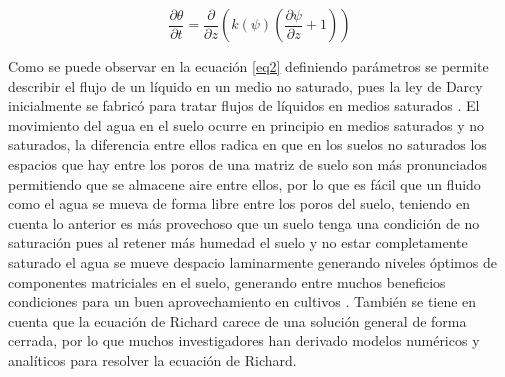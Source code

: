 \begin{equation}
	\frac{\partial\theta}{\partial t}=\frac{\partial}{\partial z}(k(\psi)(\frac{\partial\psi}{\partial z}+1))
	\label{eq2}
\end{equation}

Como se puede observar en la ecuación \eqref{eq2} definiendo parámetros se permite describir el flujo de un líquido en un medio no saturado, pues la ley de Darcy inicialmente se fabricó para tratar flujos de líquidos en medios  saturados \parencite{mawloodcomparison}. El movimiento del agua en el suelo ocurre en principio en medios saturados y no saturados, la diferencia entre ellos radica en que en los suelos no saturados los espacios que hay entre los poros de una matriz de suelo son más pronunciados permitiendo que se almacene aire entre ellos,  por lo que es  fácil que un fluido como el agua se mueva de forma libre entre los poros del suelo, teniendo en cuenta lo anterior es más provechoso que un suelo tenga una condición de no saturación pues al retener más humedad el suelo y no estar completamente saturado el agua se mueve despacio laminarmente generando niveles óptimos de componentes matriciales en el suelo, generando entre muchos beneficios condiciones para un buen aprovechamiento en cultivos  \parencite{hernandez2012estimacion}.   También se tiene en cuenta que la ecuación de Richard carece de una solución general de forma cerrada, por lo que muchos investigadores han derivado modelos numéricos y analíticos para resolver la ecuación de Richard\parencite{perau1998constitutive}.\\

